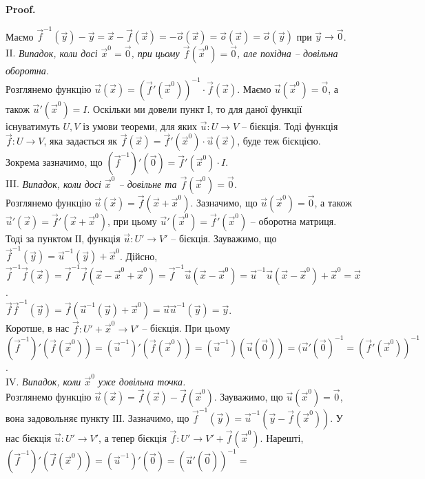 \documentclass[a4paper, 10pt]{article}
\makeatletter
\theoremstyle{theoremdd}
\theoremstyle{theoremdd}
\theoremstyle{theoremdd}
\theoremstyle{theoremdd}
\theoremstyle{theoremdd}
\theoremstyle{theoremdd}
\theoremstyle{theoremdd}
\theoremstyle{theoremdd}
\theoremstyle{theoremdd}
\renewenvironment{proof}[1][Proof.\\]{\par
\pushQED{\hfill \qed}%
\normalfont \topsep6\p@\@plus6\p@\relax
\trivlist
\item\relax
{\bfseries
#1\@addpunct{.}}\hspace\labelsep\ignorespaces
}{%
\popQED\endtrivlist\@endpefalse
}
\makeatother
\begin{document}
\begin{proof}
Маємо $\vec{f}^{-1}(\vec{y}) - \vec{y} = \vec{x} - \vec{f}(\vec{x}) = -\vec{o}(\vec{x}) = \vec{o}(\vec{x}) = \vec{o}(\vec{y})$ при $\vec{y} \to \vec{0}$.
\bigskip \\
II. \textit{Випадок, коли досі $\vec{x}^0 = \vec{0}$, при цьому $\vec{f}(\vec{x}^0) = \vec{0}$, але похідна -- довільна оборотна.}\\
Розглянемо функцію $\vec{u}(\vec{x}) = (\vec{f}'(\vec{x}^0))^{-1} \cdot \vec{f}(\vec{x})$. Маємо $\vec{u}(\vec{x}^0) = \vec{0}$, а також $\vec{u}'(\vec{x}^0) = I$. Оскільки ми довели пункт І, то для даної функції існуватимуть $U,V$ із умови теореми, для яких $\vec{u} \colon U \to V$ -- бієкція. Тоді функція $\vec{f} \colon U \to V$, яка задається як $\vec{f}(\vec{x}) = \vec{f}'(\vec{x}^0) \cdot \vec{u}(\vec{x})$, буде теж бієкцією. Зокрема зазначимо, що $(\vec{f}^{-1})'(\vec{0}) = \vec{f}'(\vec{x}^0) \cdot I$.
\bigskip \\
III. \textit{Випадок, коли досі $\vec{x}^0$ -- довільне та $\vec{f}(\vec{x}^0) = \vec{0}$.}\\
Розглянемо функцію $\vec{u}(\vec{x}) = \vec{f}(\vec{x} + \vec{x}^0)$. Зазначимо, що $\vec{u}(\vec{x}^0) = \vec{0}$, а також $\vec{u}'(\vec{x}) = \vec{f}'(\vec{x} + \vec{x}^0)$, при цьому $\vec{u}'(\vec{x}^0) = \vec{f}'(\vec{x}^0)$ -- оборотна матриця. Тоді за пунктом ІІ, функція $\vec{u} \colon U' \to V'$ -- бієкція. Зауважимо, що $\vec{f}^{-1}(\vec{y}) = \vec{u}^{-1}(\vec{y}) + \vec{x}^0$. Дійсно,\\
$\vec{f}^{-1} \vec{f} (\vec{x}) = \vec{f}^{-1} \vec{f} (\vec{x} - \vec{x}^0 + \vec{x}^0) = \vec{f}^{-1} \vec{u}(\vec{x} - \vec{x}^0) = \vec{u}^{-1} \vec{u} (\vec{x} - \vec{x}^0) + \vec{x}^0 = \vec{x}$.\\
$\vec{f} \vec{f}^{-1}(\vec{y}) = \vec{f}(\vec{u}^{-1}(\vec{y}) + \vec{x}^0) = \vec{u} \vec{u}^{-1}(\vec{y}) = \vec{y}$.\\
Коротше, в нас $\vec{f} \colon U' + \vec{x}^0 \to V'$ -- бієкція. При цьому $(\vec{f}^{-1})'(\vec{f}(\vec{x}^0)) = (\vec{u}^{-1})'(\vec{f}(\vec{x}^0)) = (\vec{u}^{-1})(\vec{u}(\vec{0})) = (\vec{u}'(\vec{0})^{-1} = (\vec{f}'(\vec{x}^0))^{-1}$.
\bigskip \\
IV. \textit{Випадок, коли $\vec{x}^0$ уже довільна точка.}\\
Розглянемо функцію $\vec{u}(\vec{x}) = \vec{f}(\vec{x}) - \vec{f}(\vec{x}^0)$. Зауважимо, що $\vec{u}(\vec{x}^0) = \vec{0}$, вона задовольняє пункту ІІІ. Зазначимо, що $\vec{f}^{-1}(\vec{y}) = \vec{u}^{-1}(\vec{y} - \vec{f}(\vec{x}^0))$. У нас бієкція $\vec{u} \colon U' \to V'$, а тепер бієкція $\vec{f} \colon U' \to V' + \vec{f}(\vec{x}^0)$. Нарешті,\\
$(\vec{f}^{-1})'(\vec{f}(\vec{x}^0)) = (\vec{u}^{-1})'(\vec{0}) = (\vec{u}'(\vec{0}))^{-1} = $
\end{proof}
\end{document}
